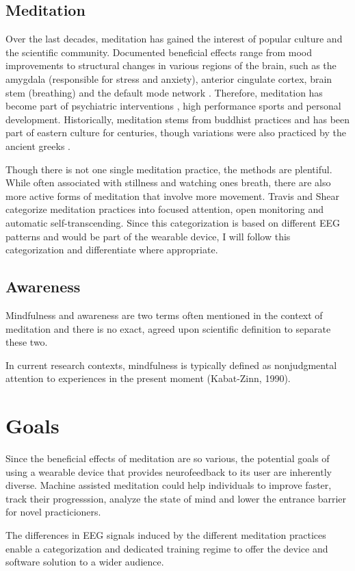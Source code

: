 \documentclass{llncs} %
\begin{document}
\subsection{Meditation}
Over the last decades, meditation has gained the interest of popular culture and the scientific community.
Documented beneficial effects range from mood improvements to structural changes \cite{Davidson} in various regions of the brain, such as the amygdala (responsible for stress and anxiety), anterior cingulate cortex, brain stem (breathing)
and the default mode network \cite{Tang:et al}.
Therefore, meditation has become part of psychiatric interventions \cite{Hoelzel}, high performance sports and personal development.
Historically, meditation stems from buddhist practices and has been part of eastern culture for centuries, though variations were also practiced by the ancient greeks \cite{Hadot:Davidson}.

Though there is not one single meditation practice, the methods are plentiful. While often associated with stillness and watching ones breath,
there are also more active forms of meditation that involve more movement. Travis and Shear categorize meditation practices into focused attention, open monitoring and automatic self-transcending.\cite{Travis} 
Since this categorization is based on different EEG patterns and would be part of the wearable device, I will follow this categorization and differentiate where appropriate.
\subsection{Awareness}
Mindfulness and awareness are two terms often mentioned in the context of meditation and there is no exact, agreed upon scientific definition to separate these two.

In current research contexts, mindfulness is typically defined as nonjudgmental attention to experiences in the present moment (Kabat-Zinn, 1990).
\section{Goals}
Since the beneficial effects of meditation are so various, the potential goals of using a wearable device 
that provides neurofeedback to its user are inherently diverse. Machine assisted meditation could help individuals to 
improve faster, track their progresssion, analyze the state of mind and lower the entrance barrier for novel practicioners. \cite{brand:del}

The differences in EEG signals induced by the different meditation practices enable a categorization
and dedicated training regime to offer the device and software solution to a wider audience. \cite{Travis}
\end{document}

